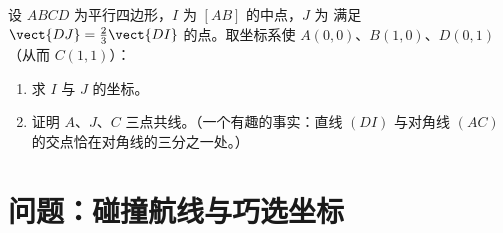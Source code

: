 \begin{exercise}[$\star\star\star$]\label{exo:g11:vect:11}
设 $ABCD$ 为平行四边形，$I$ 为 $[AB]$ 的中点，$J$ 为
满足 $\vect{DJ} = \frac23 \vect{DI}$ 的点。取坐标系使
$A(0,0)$、$B(1,0)$、$D(0,1)$（从而 $C(1,1)$）：
\begin{enumerate}
  \item 求 $I$ 与 $J$ 的坐标。
  \item 证明 $A$、$J$、$C$ 三点共线。（一个有趣的事实：直线
        $(DI)$ 与对角线 $(AC)$ 的交点恰在对角线的三分之一处。）
\end{enumerate}
\end{exercise}

\section{问题：碰撞航线与巧选坐标}


